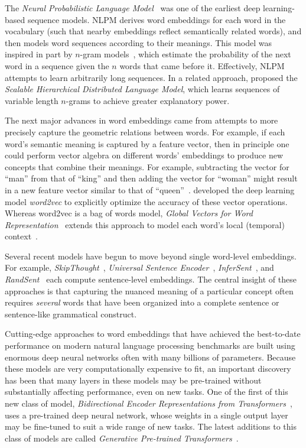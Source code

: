 \documentclass{article}
\begin{document}
The \textit{Neural Probabilistic Language Model}~\citep[NPLM;][]{BengEtal03} was one of the earliest deep learning-based sequence models.  NLPM derives word embeddings for each word in the vocabulary (such that nearby embeddings reflect semantically related words), and then models word sequences according to their meanings.  This model was inspired in part by $n$-gram models~\citep{BrowEtal92}, which estimate the probability of the next word in a sequence given the $n$ words that came before it. Effectively, NLPM attempts to learn arbitrarily long sequences.  In a related approach, \cite{MnihHint09} proposed the \textit{Scalable Hierarchical Distributed Language Model}, which learns sequences of variable length $n$-grams to achieve greater explanatory power.

The next major advances in word embeddings came from attempts to more precisely capture the geometric relations between words.  For example, if each word's semantic meaning is captured by a feature vector, then in principle one could perform vector algebra on different words' embeddings to produce new concepts that combine their meanings.  For example, subtracting the vector for ``man'' from that of ``king'' and then adding the vector for ``woman'' might result in a new feature vector similar to that of ``queen''~\citep{MikoEtal13b}.  \cite{MikoEtal13a} developed the deep learning model \textit{word2vec} to explicitly optimize the accuracy of these vector operations.  Whereas word2vec is a bag of words model, \textit{Global Vectors for Word Representation}~\citep[GloVe;][]{PennEtal14} extends this approach to model each word's local (temporal) context~\citep[also see][]{PeteEtal18}.

Several recent models have begun to move beyond single word-level embeddings.  For example, \textit{SkipThought}~\citep{KiroEtal15}, \textit{Universal Sentence Encoder}~\citep{CerEtal18}, \textit{InferSent}~\citep{ConnEtal18}, and \textit{RandSent}~\citep{WietKiel19} each compute sentence-level embeddings.  The central insight of these approaches is that capturing the nuanced meaning of a particular concept often requires \textit{several} words that have been organized into a complete sentence or sentence-like grammatical construct.

Cutting-edge approaches to word embeddings that have achieved the best-to-date performance on modern natural language processing benchmarks are built using enormous deep neural networks often with many billions of parameters.  Because these models are very computationally expensive to fit, an important discovery has been that many layers in these models may be pre-trained without substantially affecting performance, even on new tasks.  One of the first of this new class of model, \textit{Bidirectional Encoder Representations from Transformers}~\citep[BERT;][]{DevlEtal18}, uses a pre-trained deep neural network, whose weights in a single output layer may be fine-tuned to suit a wide range of new tasks.  The latest additions to this class of models are called \textit{Generative Pre-trained Transformers}~\citep[GPT;][]{RadfEtal18, RadfEtal19, BrowEtal20}.
\end{document}
